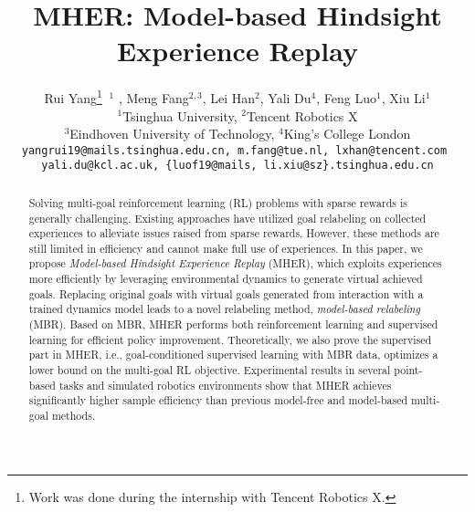 \documentclass{article}
\title{MHER: Model-based Hindsight Experience Replay}
\author{%
  Rui Yang\thanks{Work was done during the internship with Tencent Robotics X.}  $\ ^1$ , Meng Fang$^{2,3}$, Lei Han$^2$, Yali Du$^4$, Feng Luo$^1$, Xiu Li$^1$\\
  $^1$Tsinghua University, $^2$Tencent Robotics X \\ $^3$Eindhoven University of Technology, $^4$King’s College London \\
  \texttt{yangrui19@mails.tsinghua.edu.cn, m.fang@tue.nl, lxhan@tencent.com } \\
  \texttt{yali.du@kcl.ac.uk, \{luof19@mails, li.xiu@sz\}.tsinghua.edu.cn}\\
}
\begin{document}
\maketitle

\begin{abstract}
Solving multi-goal reinforcement learning (RL) problems with sparse rewards is generally challenging. Existing approaches have utilized goal relabeling on collected experiences to alleviate issues raised from sparse rewards. However, these methods are still limited in efficiency and cannot make full use of experiences. In this paper, we propose \emph{Model-based Hindsight Experience Replay} (MHER), which exploits experiences more efficiently by leveraging environmental dynamics to generate virtual achieved goals. Replacing original goals with virtual goals generated from interaction with a trained dynamics model leads to a novel relabeling method, \emph{model-based relabeling} (MBR). Based on MBR, MHER performs both reinforcement learning and supervised learning for efficient policy improvement. Theoretically, we also prove the supervised part in MHER, i.e., goal-conditioned supervised learning with MBR data, optimizes a lower bound on the multi-goal RL objective. Experimental results in several point-based tasks and simulated robotics environments show that MHER achieves significantly higher sample efficiency than previous model-free and model-based multi-goal methods.

\end{abstract}
\end{document}
